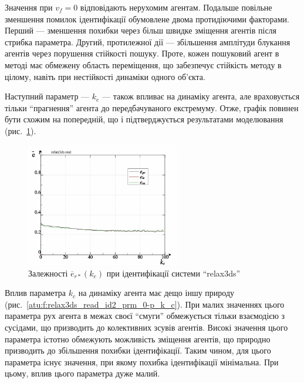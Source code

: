 Значення при
$v_f = 0 $ відповідають нерухомим агентам. Подальше повільне
зменшення помилок ідентифікації обумовлене двома
протидіючими факторами. Перший --- зменшення похибки через
більш швидке зміщення агентів після стрибка параметра. Другий,
протилежної дії --- збільшення амплітуди блукання агентів
через порушення стійкості пошуку. Проте, кожен пошуковий агент
в методі має обмежену область переміщення, що
забезпечує стійкість методу в цілому, навіть при нестійкості
динаміки одного об'єкта.

Наступний параметр ---
$k_e $ --- також впливає на динаміку агента, але враховується
тільки ``прагнення'' агента до передбачуваного екстремуму. Отже,
графік повинен бути схожим на попередній, що і підтверджується
результатами моделювання (рис.~\ref{atu:f:relax3ds_read_id2_prm_0-p_k_e}).

\begin{figure}[htb!]
  \centerline{\includegraphics[width=0.6\textwidth]{p/relax3ds_read_id2_prm_0-p_k_e.png} }
  \caption{Залежності $ \overline{e}_{r *} (k_e) $ при ідентифікації системи ``relax3ds''}
  \label{atu:f:relax3ds_read_id2_prm_0-p_k_e}
\end{figure}

Вплив параметра
$k_c $ на динаміку агента має дещо іншу природу
(рис.~\ref{atu:f:relax3ds_read_id2_prm_0-p_k_c}). При малих значеннях цього параметра
рух агента в межах своєї ``смуги'' обмежується тільки взаємодією
з сусідами, що призводить до колективних зсувів агентів. Високі
значення цього параметра істотно обмежують можливість
зміщення агентів, що природно призводить до збільшення похибки
ідентифікації. Таким чином, для цього параметра існує значення,
при якому похибка ідентифікації мінімальна. При цьому,
вплив цього параметра дуже малий.

